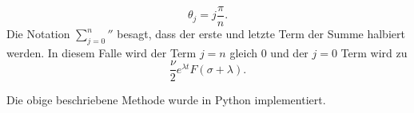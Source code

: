 \[
\theta_{j} = j \frac{\pi}{n}.
\]
Die Notation ${\sum_{j=0}^n}''$ besagt, dass der erste und letzte
Term der Summe halbiert werden.
In diesem Falle wird der Term $j=n$ gleich 0 und der $j=0$ Term wird zu
\[
\frac{\nu}{2}e^{\lambda t}F(\sigma + \lambda).
\]


Die obige beschriebene Methode wurde in Python implementiert.

